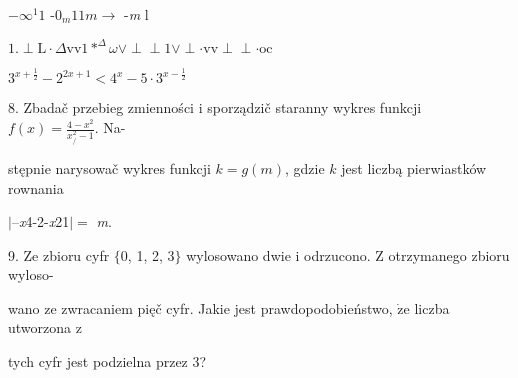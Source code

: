 \documentclass[a4paper,12pt]{article}
\begin{document}
$-\infty^{1}1$ -$0_{m}11 m \rightarrow$ -{\it m} l

$1. \perp \mathrm{L}\cdot\Delta \mathrm{v}\mathrm{v}1*^{\Delta}\omega\vee\perp\perp 1\vee\perp\cdot \mathrm{v}\mathrm{v}\perp\perp\cdot \mathrm{o}\mathrm{c}$

$3^{x+\frac{1}{2}}-2^{2x+1}<4^{x}-5\cdot 3^{x-\frac{1}{2}}$

8. Zbadač przebieg zmienności $\mathrm{i}$ sporządzič staranny wykres funkcji $f(x) = \displaystyle \frac{4-x^{2}}{x_{/}^{2}-1}$. Na-

stępnie narysowač wykres funkcji $k=g(m)$, gdzie $k$ jest liczbą pierwiastków rownania

$|$--{\it x}4-2-{\it x}21$|=$ {\it m}.

9. Ze zbioru cyfr $\{0$, 1, 2, 3$\}$ wylosowano dwie $\mathrm{i}$ odrzucono. $\mathrm{Z}$ otrzymanego zbioru wyloso-

wano ze zwracaniem pięč cyfr. Jakie jest prawdopodobieństwo, $\dot{\mathrm{z}}\mathrm{e}$ liczba utworzona $\mathrm{z}$

tych cyfr jest podzielna przez 3?
\end{document}
